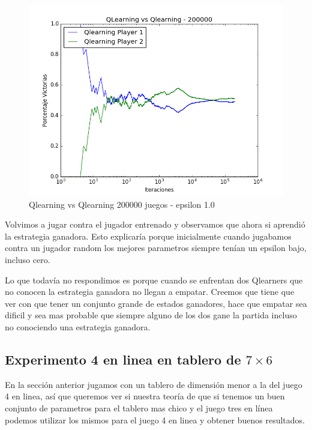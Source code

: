 \begin{figure}[h]
 \centering
 \begin{minipage}{.45\textwidth}
	\centering
	\includegraphics[scale=0.35]{img1/QlearningVsQlearning_200000_6x5_merge_e0p1.png}
        \caption{Qlearning vs Qlearning 200000 juegos - epsilon 1.0}
  \end{minipage}
\end{figure}


Volvimos a jugar contra el jugador entrenado y observamos que ahora si aprendió la estrategia ganadora. Esto explicaría porque inicialmente cuando jugabamos contra un jugador random los mejores parametros siempre tenían un epsilon bajo, incluso cero. 

Lo que todavía no respondimos es porque cuando se enfrentan dos Qlearners que no conocen la estrategia ganadora no llegan a empatar. Creemos que tiene que ver con que tener un conjunto grande de estados ganadores, hace que empatar sea dificil y sea mas probable que siempre alguno de los dos gane la partida incluso no conociendo una estrategia ganadora.\\



\subsection{Experimento 4 en linea en tablero de $7\times6$}
En la sección anterior jugamos con un tablero de dimensión menor a la del juego 4 en linea, así que queremos ver si nuestra teoría de que si tenemos un buen conjunto de parametros para el tablero mas chico y el juego tres en línea podemos utilizar los mismos para el juego 4 en linea y obtener buenos resultados.

